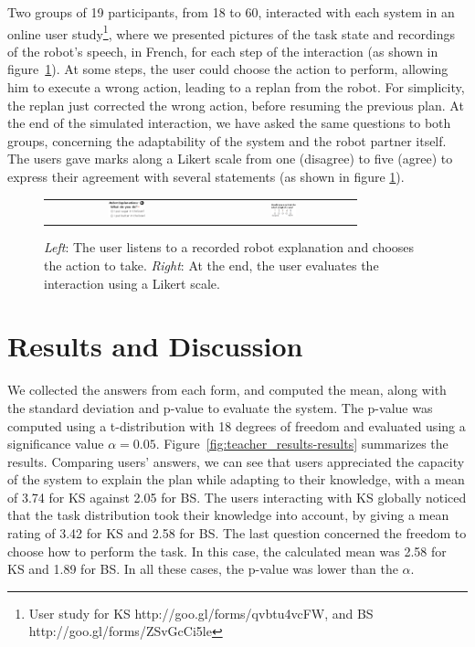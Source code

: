 Two groups of 19 participants, from 18 to 60, interacted with each system in an online user study\footnote{User study for KS http://goo.gl/forms/qvbtu4vcFW, and BS http://goo.gl/forms/ZSvGcCi5le}, where we presented pictures of the task state and recordings of the robot's speech, in French, for each step of the interaction (as shown in figure~\ref{fig:teacher_results-user_study}).
At some steps, the user could choose the action to perform, allowing him to execute a wrong action, leading to a replan from the robot. For simplicity, the replan just corrected the wrong action, before resuming the previous plan. 
At the end of the simulated interaction, we have asked the same questions to both groups, concerning the adaptability of the system and the robot partner itself. 
The users gave marks along a Likert scale from one (disagree) to five (agree) to express their agreement with several statements (as shown in figure \ref{fig:teacher_results-user_study}).

\begin{figure}[ht!]
 \centering
 \begin{tabular}{cc}
  \includegraphics[width=0.24\textwidth]{img/teacher/ustudy9.png} &
  \includegraphics[width=0.19\textwidth]{img/teacher/ustudy11.png}
 \end{tabular} 
 \caption[User studies on plan adaptation]{\textit{Left}: The user listens to a recorded robot explanation and chooses the action to take. \textit{Right}: At the end, the user evaluates the interaction using a Likert scale.}
 \label{fig:teacher_results-user_study}
 \end{figure}

\section{Results and Discussion}
\label{sec:teacher_results-results}

We collected the answers from each form, and computed the mean, along with the standard deviation and p-value to evaluate the system. The p-value was computed using a t-distribution with 18 degrees of freedom and evaluated using a significance value $\alpha=0.05$.
Figure~\ref{fig:teacher_results-results} summarizes the results. Comparing users' answers, we can see that users appreciated the capacity of the system to explain the plan while adapting to their knowledge, with a mean of 3.74 for KS against 2.05 for BS. The users interacting with KS globally noticed that the task distribution took their knowledge into account, by giving a mean rating of 3.42 for KS and 2.58 for BS. The last question concerned the freedom to choose how to perform the task. In this case, the calculated mean was 2.58 for KS and 1.89 for BS. In all these cases, the p-value was lower than the $\alpha$. 

